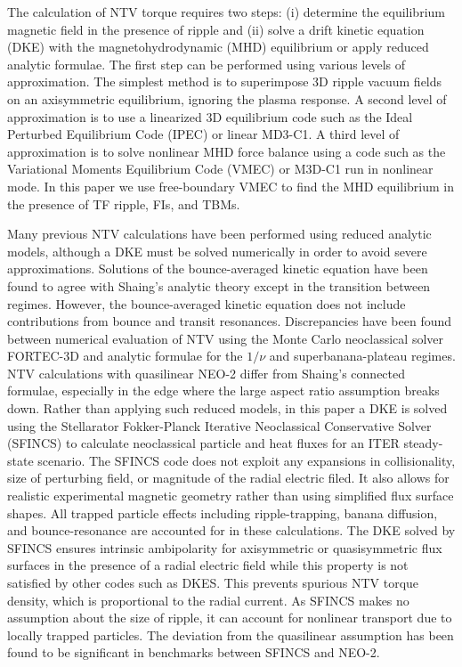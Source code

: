 \documentclass[aip, pop, preprint]{revtex4-1}
\numberwithin{figure}{section}
\numberwithin{equation}{section}
\begin{document}
The calculation of NTV torque requires two steps: (i) determine the equilibrium magnetic field in the presence of ripple and (ii) solve a drift kinetic equation (DKE) with the magnetohydrodynamic (MHD) equilibrium or apply reduced analytic formulae. The first step can be performed using various levels of approximation. The simplest method is to superimpose 3D ripple vacuum fields on an axisymmetric equilibrium, ignoring the plasma response.  A second level of approximation is to use a linearized 3D equilibrium code such as the Ideal Perturbed Equilibrium Code (IPEC)\cite{Park2009} or linear MD3-C1.\cite{Jardin2008} A third level of approximation is to solve nonlinear MHD force balance using a code such as the Variational Moments Equilibrium Code (VMEC)\cite{Hirshman1986a} or M3D-C1\cite{Ferraro2010} run in nonlinear mode. In this paper we use free-boundary VMEC to find the MHD equilibrium in the presence of TF ripple, FIs, and TBMs. 

Many previous NTV calculations\cite{Zhu2006,Hua2010,Cole2011,Park2009} have been performed using reduced analytic models, although a DKE must be solved numerically in order to avoid severe approximations. Solutions of the bounce-averaged kinetic equation have been found to agree with Shaing's analytic theory except in the transition between regimes.\cite{Sun2010} However, the bounce-averaged kinetic equation does not include contributions from bounce and transit resonances. Discrepancies have been found between numerical evaluation of NTV using the Monte Carlo neoclassical solver FORTEC-3D and analytic formulae for the $1/\nu$ and superbanana-plateau regimes.\cite{Satake2011a,Satake2011b} NTV calculations with quasilinear NEO-2 differ from Shaing's connected formulae,\cite{Shaing2010} especially in the edge where the large aspect ratio assumption breaks down.\cite{Martitsch2016} Rather than applying such reduced models, in this paper a DKE is solved using the Stellarator Fokker-Planck Iterative Neoclassical Conservative Solver (SFINCS) \cite{Landreman2014} to calculate neoclassical particle and heat fluxes for an ITER steady-state scenario. The SFINCS code does not exploit any expansions in collisionality, size of perturbing field, or magnitude of the radial electric filed. It also allows for realistic experimental magnetic geometry rather than using simplified flux surface shapes. All trapped particle effects including ripple-trapping,\cite{Stringer1972} banana diffusion,\cite{Linsker1982} and bounce-resonance\cite{Linsker1982} are accounted for in these calculations. The DKE solved by SFINCS ensures intrinsic ambipolarity for axisymmetric or quasisymmetric flux surfaces in the presence of a radial electric field while this property is not satisfied by other codes such as DKES.\cite{Hirshman1986b,Rij1989} This prevents spurious NTV torque density, which is proportional to the radial current. As SFINCS makes no assumption about the size of ripple, it can account for nonlinear transport due to locally trapped particles. The deviation from the quasilinear assumption has been found to be significant in benchmarks between SFINCS and NEO-2.\cite{Martitsch2016}
\end{document}
